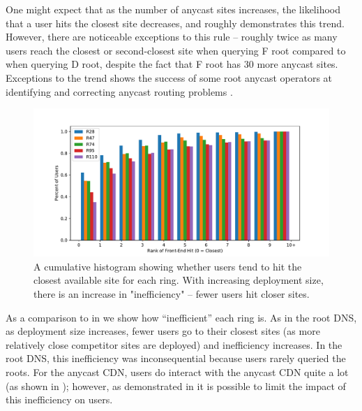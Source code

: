 \documentclass[sigconf,letterpaper,nonacm,10pt,anonymous]{acmart}
\begin{document}
One might expect that as the number of anycast sites increases, the
likelihood that a user hits the closest site decreases, and
 roughly demonstrates this trend.
However, there are noticeable exceptions to this rule -- roughly twice
as many users reach the closest or second-closest site when querying F
root compared to when querying D root, despite the fact that F root has
30 more anycast sites. Exceptions to the trend shows the success of some
root anycast operators at identifying and correcting anycast routing
problems \cite{Bellis15a}.

\begin{figure}
    \centering
    \includegraphics[width=\linewidth]{figures/distance_rank_microsoft.pdf}
    \caption{A cumulative histogram showing whether users tend to hit the closest available site for each ring. With increasing deployment size, there is an increase in "inefficiency" -- fewer users hit closer sites.}
    \label{fig:distance_rank_microsoft}
\end{figure}

As a comparison to  in
 we show how ``inefficient'' each ring
is. As in the root DNS, as deployment size increases, fewer users go to
their closest sites (as more relatively close competitor sites are
deployed) and inefficiency increases. In the root DNS, this inefficiency
was inconsequential because users rarely queried the roots. For the
anycast CDN, users do interact with the anycast CDN quite a lot (as
shown in ); however, as demonstrated in
 it is possible to
limit the impact of this inefficiency on users.

\end{document}

